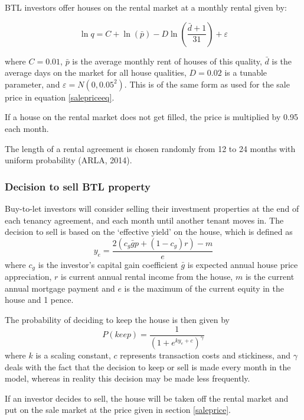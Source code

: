 \documentclass{report}
\begin{document}
BTL investors offer houses on the rental market at a monthly rental given by:

\begin{equation}
\ln q=C+\ln (\bar{p})-D\ln \left( \frac{\bar{d}+1}{31}\right) +\varepsilon
\end{equation}

where $C=0.01$, $\bar{p}$ is the average monthly rent of houses of this quality, $\bar{d}$ is the average days on the market for all house qualities, $D=0.02$ is a tunable parameter, and $\varepsilon=N(0,0.05^{2})$. This is of the same form as used for the sale price in equation \ref{salepriceeq}.

If a house on the rental market does not get filled, the price is multiplied by 0.95 each month.

The length of a rental agreement is chosen randomly from 12 to 24 months with uniform probability (ARLA, 2014).

\subsubsection{Decision to sell BTL property}
\label{sellbtl}
Buy-to-let investors will consider selling their investment properties at the end of each tenancy agreement, and each month until another tenant moves in. The decision to sell is based on the `effective yield' on the house, which is defined as
\begin{equation}
y_e = \frac{2(c_g \bar{g}p + (1-c_g)r) - m}{e} 
\end{equation}
where $c_g$ is the investor's capital gain coefficient $\bar{g}$ is expected annual house price appreciation, $r$ is current annual rental income from the house, $m$ is the current annual mortgage payment and $e$ is the maximum of the current equity in the house and 1 pence.

The probability of deciding to keep the house is then given by
\begin{equation}
P(keep) = \frac{1}{(1 + e^{ky_e+c})^\gamma}
\end{equation}
where $k$ is a scaling constant, $c$ represents transaction costs and stickiness, and $\gamma$ deals with the fact that the decision to keep or sell is made every month in the model, whereas in reality this decision may be made less frequently.

If an investor decides to sell, the house will be taken off the rental market and put on the sale market at the price given in section \ref{saleprice}.
\end{document}
